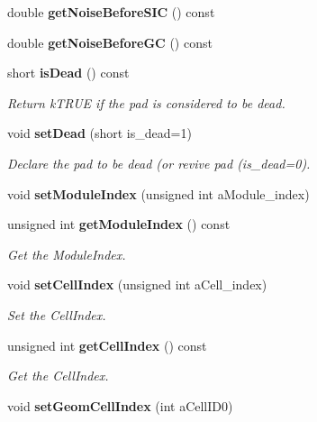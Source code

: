 \begin{DoxyCompactItemize}
\item 
double {\bfseries getNoiseBeforeSIC} () const \label{classCALICE_1_1NoiseParameter_a070e69c9ab4182aff016923bccd1e0f8}

\item 
double {\bfseries getNoiseBeforeGC} () const \label{classCALICE_1_1NoiseParameter_a92bc44cb2669afeffc46dbbc297c8891}

\item 
short {\bf isDead} () const \label{classCALICE_1_1NoiseParameter_aaad737204e2573e3fb934bb9ef373107}

\begin{DoxyCompactList}\small\item\em Return kTRUE if the pad is considered to be dead. \item\end{DoxyCompactList}\item 
void {\bf setDead} (short is\_\-dead=1)
\begin{DoxyCompactList}\small\item\em Declare the pad to be dead (or revive pad (is\_\-dead=0). \item\end{DoxyCompactList}\item 
void {\bfseries setModuleIndex} (unsigned int aModule\_\-index)\label{classCALICE_1_1NoiseParameter_a4ec1782980dd013e8f361c32f9280fad}

\item 
unsigned int {\bf getModuleIndex} () const 
\begin{DoxyCompactList}\small\item\em Get the ModuleIndex. \item\end{DoxyCompactList}\item 
void {\bf setCellIndex} (unsigned int aCell\_\-index)\label{classCALICE_1_1NoiseParameter_a6de76912e4150b4ce0b63688be1de595}

\begin{DoxyCompactList}\small\item\em Set the CellIndex. \item\end{DoxyCompactList}\item 
unsigned int {\bf getCellIndex} () const 
\begin{DoxyCompactList}\small\item\em Get the CellIndex. \item\end{DoxyCompactList}\item 
void {\bf setGeomCellIndex} (int aCellID0)\label{classCALICE_1_1NoiseParameter_a7a85f45d0e5d9bfcd07574f0ffa4ce2d}


\end{DoxyCompactItemize}
